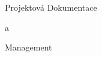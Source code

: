 
\nopagenumbers 
 
\def\prepghook{\pdfliteral{q \bgcolor\space k -0.996264 0 0 0.996264 -72 72 cm
  \nopt{\hoffset} \nopt{\voffset} -\nopt{\pdfpagewidth} -\nopt{\pdfpageheight} re f Q}}
\def\nopt#1{\expandafter\ignorept\the#1}
 
\def\setbasecolor#1{#1\expandafter\setbasecolorA#1\pdfblackcolor}
\def\setbgcolor#1{\expandafter\setbasecolorA#1\bgcolor}
\def\setbasecolorA#1#2#3{\def#3{#2}}

\setbasecolor\White

\setbgcolor\Black

\voffset 5cm

{ \nadpis \centerline {Projektová Dokumentace}}
\par
{ \nadpis \centerline {a}}
{ \nadpis \centerline {Management}}

\vfill\break

\voffset 0cm
\setbasecolor\Black
\setbgcolor\White
